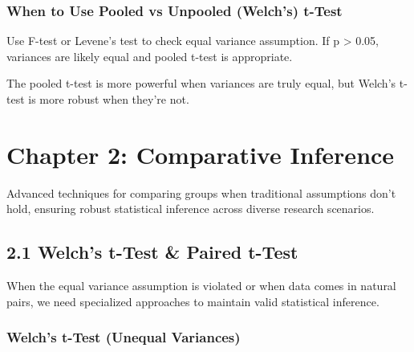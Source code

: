 \documentclass[
  11pt,
  letterpaper,
  oneside]{book}
\begin{document}
\subsection{When to Use Pooled vs Unpooled (Welch's)
t-Test}\label{when-to-use-pooled-vs-unpooled-welchs-t-test}

\begin{tcolorbox}[enhanced jigsaw, opacityback=0, opacitybacktitle=0.6, colbacktitle=quarto-callout-warning-color!10!white, toptitle=1mm, colframe=quarto-callout-warning-color-frame, breakable, leftrule=.75mm, left=2mm, titlerule=0mm, bottomtitle=1mm, colback=white, title=\textcolor{quarto-callout-warning-color}{\faExclamationTriangle}\hspace{0.5em}{Testing Equal Variances}, rightrule=.15mm, coltitle=black, arc=.35mm, bottomrule=.15mm, toprule=.15mm]

Use F-test or Levene's test to check equal variance assumption. If p
\textgreater{} 0.05, variances are likely equal and pooled t-test is
appropriate.

\end{tcolorbox}

The pooled t-test is more powerful when variances are truly equal, but
Welch's t-test is more robust when they're not.


\chapter{Chapter 2: Comparative
Inference}\label{chapter-2-comparative-inference}

Advanced techniques for comparing groups when traditional assumptions
don't hold, ensuring robust statistical inference across diverse
research scenarios.

\section{2.1 Welch's t-Test \& Paired
t-Test}\label{welchs-t-test-paired-t-test}

When the equal variance assumption is violated or when data comes in
natural pairs, we need specialized approaches to maintain valid
statistical inference.

\subsection{Welch's t-Test (Unequal
Variances)}\label{welchs-t-test-unequal-variances}
\end{document}
